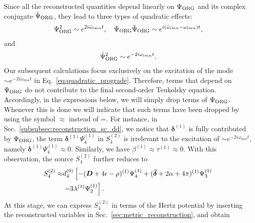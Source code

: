 \documentclass[aps,prd,amsmath,floats,floatfix, twocolumn,
superscriptaddress,nofootinbib,showpacs]{revtex4-1}
\newcommand{\hertz}{\Psi_{\rm ORG}}
\newcommand{\hertzbar}{\bar{\Psi}_{\rm ORG}}
\begin{document}
Since all the reconstructed quantities depend linearly on $\hertz$ and its complex conjugate $\hertzbar$, they lead to three types of quadratic effects:
\begin{align}
    \hertz^2\sim e^{2i\bar{\omega}_{lmn}t},\quad \hertz\hertzbar\sim e^{i(\bar{\omega}_{lmn}-\omega_{lmn})t},
\end{align}
and
\begin{align}
    \hertzbar^2 \sim e^{-2i\omega_{lmn}t}. \label{eq:quadratic_prograde}
\end{align}
Our subsequent calculations focus exclusively on the excitation of the mode $\sim e^{-2i\omega_{lmn}t}$ in Eq.~\eqref{eq:quadratic_prograde}. Therefore,
terms that depend on $\hertz$ do not contribute to the final second-order Teukolsky equation. Accordingly, in the expressions below, we will simply drop terms of $\hertz$. Whenever this is done we will
indicate that such terms have been dropped by using the symbol $\approx$ instead of =. For instance, in Sec.~\ref{subsubsec:reconstruction_sc_dd}, we notice that $\bm{\delta}^{(1)}$ is fully contributed by $\hertz$, the term $\bm{\delta}^{(1)}\Psi_4^{(1)}$ in $S_4^{(2)}$ is irrelevant to the excitation of $\sim e^{-2i\omega_{lmn}t}$, namely $\bm{\delta}^{(1)}\Psi_4^{(1)}\approx 0$. Similarly, we have $\beta^{(1)} \approx\tau^{(1)}\approx0$. With this observation, the source $S_4^{(2)}$ further reduces to
\begin{align}
    S_4^{(2)}\approx &d_4^{(0)}\left[-(\bm{D}+4\epsilon-\rho)^{(1)} \Psi_4^{(1)} + (\bm{\bar{\delta}}+2\alpha+4\pi)^{(1)} \Psi_3^{(1)}\right. \notag \\
    &\left. -3\lambda^{(1)}\Psi_2^{(1)}\right]. \label{eq:final_source_from_NR_variables}
\end{align}
At this stage, we can express $S_4^{(2)}$ in terms of the Hertz potential by inserting the reconstructed variables in Sec.~\ref{sec:metric_reconstruction}, and obtain
\end{document}
